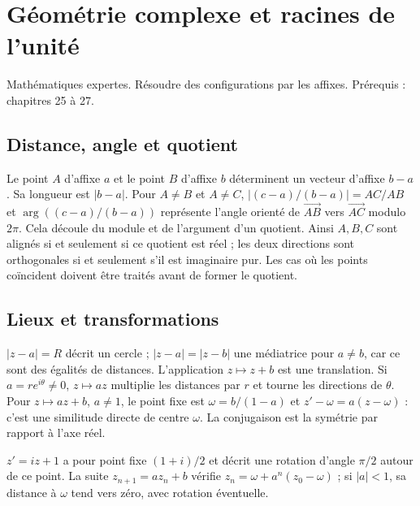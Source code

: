 \documentclass[../cours_tle.tex]{subfiles}
\begin{document}
\setcounter{chapter}{27}
\chapter{Géométrie complexe et racines de l’unité}
\label{ch:28}
\begin{objectif}
Mathématiques expertes. Résoudre des configurations par les affixes. Prérequis : chapitres 25 à 27.
\end{objectif}
\section{Distance, angle et quotient}
Le point $A$ d'affixe $a$ et le point $B$ d'affixe $b$ déterminent un vecteur d'affixe $b-a$. Sa longueur est $|b-a|$.
Pour $A\ne B$ et $A\ne C$,
$\left|(c-a)/(b-a)\right|=AC/AB$ et
$\arg((c-a)/(b-a))$ représente l'angle orienté de $\overrightarrow{AB}$ vers $\overrightarrow{AC}$ modulo $2\pi$.
Cela découle du module et de l'argument d'un quotient.
Ainsi $A,B,C$ sont alignés si et seulement si ce quotient est réel ; les deux directions sont orthogonales si et seulement s'il est imaginaire pur. Les cas où les points coïncident doivent être traités avant de former le quotient.
\section{Lieux et transformations}
$|z-a|=R$ décrit un cercle ; $|z-a|=|z-b|$ une médiatrice pour $a\ne b$, car ce sont des égalités de distances.
L'application $z\mapsto z+b$ est une translation. Si $a=re^{i\theta}\ne0$, $z\mapsto az$ multiplie les distances par $r$ et tourne les directions de $\theta$.
Pour $z\mapsto az+b$, $a\ne1$, le point fixe est $\omega=b/(1-a)$ et
$z'-\omega=a(z-\omega)$ : c'est une similitude directe de centre $\omega$.
La conjugaison est la symétrie par rapport à l'axe réel.
\begin{exemple}
$z'=iz+1$ a pour point fixe $(1+i)/2$ et décrit une rotation d'angle $\pi/2$ autour de ce point.
La suite $z_{n+1}=az_n+b$ vérifie $z_n=\omega+a^n(z_0-\omega)$ ; si $|a|<1$, sa distance à $\omega$ tend vers zéro, avec rotation éventuelle.
\end{exemple}
\end{document}
